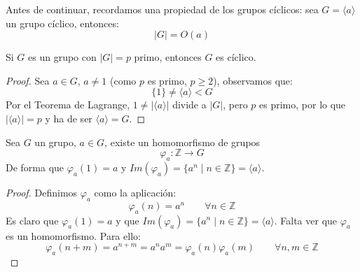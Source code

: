 Antes de continuar, recordamos una propiedad de los grupos cíclicos: sea $G = \langle a \rangle $ un grupo cíclico, entonces:
\begin{equation*}
    |G| = O(a)
\end{equation*}

\begin{prop}\label{prop:grupo_primo}
    Si $G$ es un grupo con $|G|=p$ primo, entonces $G$ es cíclico.
    \begin{proof}
        Sea $a\in G$, $a\neq 1$ (como $p$ es primo, $p\geq 2$), observamos que:
        \begin{equation*}
            \{1\} \neq \langle a \rangle < G
        \end{equation*}
        Por el Teorema de Lagrange, $1\neq |\langle a \rangle | $ divide a $|G|$, pero $p$ es primo, por lo que $|\langle a \rangle | = p$ y ha de ser $\langle a \rangle = G$.
    \end{proof}
\end{prop}

\begin{lema}
    Sea $G$ un grupo, $a\in G$, existe un homomorfismo de grupos 
    \begin{equation*}
        \varphi_a:\mathbb{Z}\to G
    \end{equation*}
    De forma que $\varphi_a(1) = a$ y $Im(\varphi_a) = \{a^n \mid n \in \mathbb{Z}\} = \langle a \rangle$.
    \begin{proof}
        Definimos $\varphi_a$ como la aplicación:
        \begin{equation*}
            \varphi_a(n) = a^n \qquad \forall n\in \mathbb{Z}
        \end{equation*}
        Es claro que $\varphi_a(1)=a$ y que $Im(\varphi_a) = \{a^n \mid n\in \mathbb{Z}\} = \langle a \rangle $. Falta ver que $\varphi_a$ es un homomorfismo. Para ello:
        \begin{equation*}
            \varphi_a(n+m) = a^{n+m} = a^n a^m = \varphi_a(n)\varphi_a(m) \qquad \forall n,m\in \mathbb{Z}
        \end{equation*}
    \end{proof}
\end{lema}

